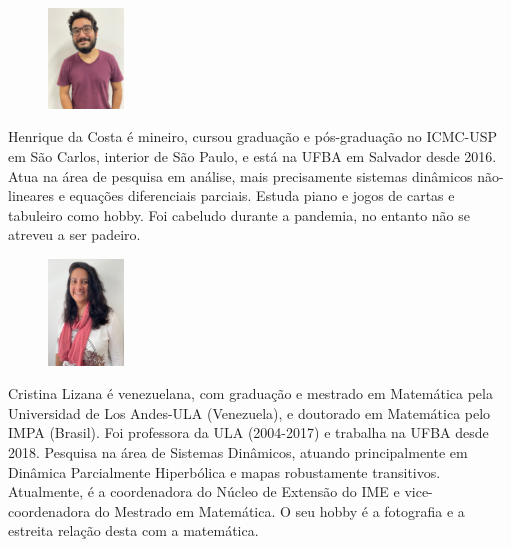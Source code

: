 \documentclass{hipatia}
\begin{document}
\vspace{1.5cm}
\begin{figure}
	\vspace{-10pt}
	\includegraphics[width=2cm]{Henrique.jpg}
\end{figure}\noindent  
  Henrique da Costa é mineiro, cursou graduação e pós-graduação 
  no ICMC-USP em São Carlos, interior de São Paulo, e está na UFBA em Salvador 
  desde 2016. Atua na área de pesquisa em análise, mais precisamente sistemas 
  dinâmicos não-lineares e equações diferenciais parciais. 
  Estuda piano e jogos de cartas e tabuleiro como hobby. 
  Foi cabeludo durante a pandemia, no entanto não se atreveu a ser padeiro.
\vspace{0.5cm}
\pagebreak 

\begin{figure}
	\vspace{-0pt}
	\includegraphics[width=2cm]{Cristina.jpg}
\end{figure}\noindent  
Cristina Lizana é venezuelana, com graduação e mestrado em Matemática 
pela Universidad de Los Andes-ULA (Venezuela), e doutorado em Matemática pelo IMPA (Brasil).
Foi professora da ULA (2004-2017) e trabalha na UFBA desde 2018. Pesquisa na área de 
Sistemas Dinâmicos, atuando principalmente em Dinâmica Parcialmente Hiperbólica 
e mapas robustamente transitivos. Atualmente, é a coordenadora do Núcleo de Extensão do IME e vice-coordenadora do Mestrado em Matemática. O seu hobby é a fotografia e a estreita relação desta com a matemática.
\end{document}
